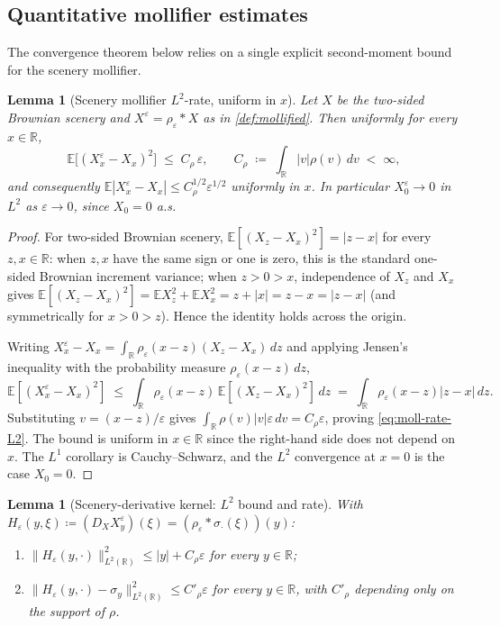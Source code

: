 \documentclass[11pt,reqno]{amsart}
\theoremstyle{plain}
\newtheorem{lemma}[theorem]{Lemma}
\theoremstyle{definition}
\theoremstyle{remark}
\newcommand{\R}{\mathbb{R}}
\newcommand{\E}{\mathbb{E}}
\begin{document}
\subsection*{Quantitative mollifier estimates}

The convergence theorem below relies on a single explicit second-moment
bound for the scenery mollifier.

\begin{lemma}[Scenery mollifier $L^{2}$-rate, uniform in $x$]
\label{lem:moll-rate}
Let $X$ be the two-sided Brownian scenery and $X^{\varepsilon}=
\rho_\varepsilon*X$ as in \cref{def:mollified}. Then \emph{uniformly}
for every $x\in\R$,
\begin{equation}\label{eq:moll-rate-L2}
  \E\bigl[(X^{\varepsilon}_x-X_x)^{2}\bigr]\;\le\;C_\rho\,\varepsilon,
  \qquad C_\rho\;\coloneqq\;\int_\R|v|\rho(v)\,dv\;<\;\infty,
\end{equation}
and consequently $\E|X^\varepsilon_x-X_x|\le C_\rho^{1/2}\varepsilon^{1/2}$
uniformly in $x$. In particular $X^\varepsilon_0\to 0$ in $L^{2}$ as
$\varepsilon\to 0$, since $X_0=0$ a.s.
\end{lemma}

\begin{proof}
For two-sided Brownian scenery, $\E[(X_z-X_x)^{2}]=|z-x|$ for every
$z,x\in\R$: when $z,x$ have the same sign or one is zero, this is the
standard one-sided Brownian increment variance; when $z>0>x$,
independence of $X_z$ and $X_x$ gives
$\E[(X_z-X_x)^{2}]=\E X_z^{2}+\E X_x^{2}=z+|x|=z-x=|z-x|$ (and
symmetrically for $x>0>z$). Hence the identity holds across the
origin.

Writing $X^\varepsilon_x-X_x=\int_\R\rho_\varepsilon(x-z)(X_z-X_x)\,dz$
and applying Jensen's inequality with the probability measure
$\rho_\varepsilon(x-z)\,dz$,
\[
  \E[(X^\varepsilon_x-X_x)^{2}]
  \;\le\;\int_\R\rho_\varepsilon(x-z)\,\E[(X_z-X_x)^{2}]\,dz
  \;=\;\int_\R\rho_\varepsilon(x-z)|z-x|\,dz.
\]
Substituting $v=(x-z)/\varepsilon$ gives
$\int_\R\rho(v)|v|\varepsilon\,dv=C_\rho\varepsilon$, proving
\eqref{eq:moll-rate-L2}. The bound is uniform in $x\in\R$ since the
right-hand side does not depend on $x$. The $L^{1}$ corollary is
Cauchy--Schwarz, and the $L^{2}$ convergence at $x=0$ is the case
$X_0=0$.
\end{proof}

\begin{lemma}[Scenery-derivative kernel: $L^{2}$ bound and rate]\label{lem:moll-H}
With $H_\varepsilon(y,\xi)\coloneqq(D_XX^\varepsilon_y)(\xi)=(\rho_\varepsilon*\sigma_\cdot(\xi))(y)$:
\begin{enumerate}
\item[(a)] $\|H_\varepsilon(y,\cdot)\|_{L^{2}(\R)}^{2}\le|y|+C_\rho\varepsilon$
  for every $y\in\R$;
\item[(b)] $\|H_\varepsilon(y,\cdot)-\sigma_y\|_{L^{2}(\R)}^{2}\le C'_\rho\varepsilon$
  for every $y\in\R$, with $C'_\rho$ depending only on the support of
  $\rho$.
\end{enumerate}
\end{lemma}
\end{document}
